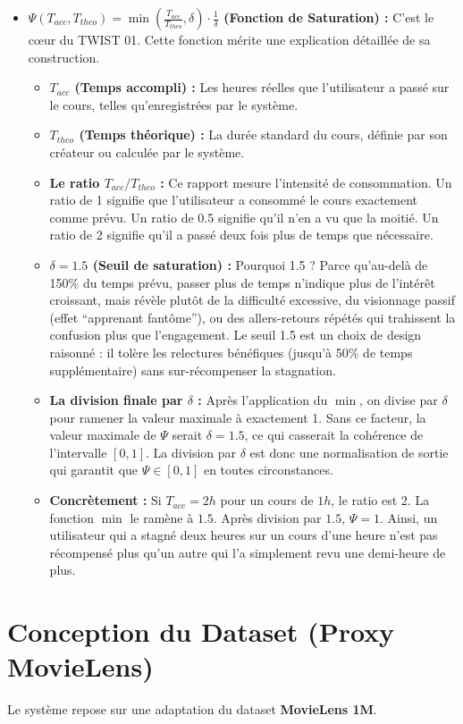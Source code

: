 \documentclass[11pt,a4paper]{article}
\begin{document}
\begin{itemize}
    \item \textbf{$\Psi(T_{acc}, T_{theo}) = \min\left( \frac{T_{acc}}{T_{theo}}, \delta \right) \cdot \frac{1}{\delta}$ (Fonction de Saturation) :}
    C'est le c\oe ur du TWIST 01. Cette fonction mérite une explication détaillée de sa construction.
    \begin{itemize}
        \item \textbf{$T_{acc}$ (Temps accompli) :} Les heures réelles que l'utilisateur a passé sur le cours, telles qu'enregistrées par le système.
        \item \textbf{$T_{theo}$ (Temps théorique) :} La durée standard du cours, définie par son créateur ou calculée par le système.
        \item \textbf{Le ratio $T_{acc}/T_{theo}$ :} Ce rapport mesure l'intensité de consommation. Un ratio de 1 signifie que l'utilisateur a consommé le cours exactement comme prévu. Un ratio de 0.5 signifie qu'il n'en a vu que la moitié. Un ratio de 2 signifie qu'il a passé deux fois plus de temps que nécessaire.
        \item \textbf{$\delta = 1.5$ (Seuil de saturation) :} Pourquoi 1.5 ? Parce qu'au-delà de 150\% du temps prévu, passer plus de temps n'indique plus de l'intérêt croissant, mais révèle plutôt de la difficulté excessive, du visionnage passif (effet ``apprenant fantôme''), ou des allers-retours répétés qui trahissent la confusion plus que l'engagement. Le seuil 1.5 est un choix de design raisonné : il tolère les relectures bénéfiques (jusqu'à 50\% de temps supplémentaire) sans sur-récompenser la stagnation.
        \item \textbf{La division finale par $\delta$ :} Après l'application du $\min$, on divise par $\delta$ pour ramener la valeur maximale à exactement 1. Sans ce facteur, la valeur maximale de $\Psi$ serait $\delta = 1.5$, ce qui casserait la cohérence de l'intervalle $[0,1]$. La division par $\delta$ est donc une normalisation de sortie qui garantit que $\Psi \in [0, 1]$ en toutes circonstances.
        \item \textbf{Concrètement :} Si $T_{acc} = 2h$ pour un cours de $1h$, le ratio est 2. La fonction $\min$ le ramène à $1.5$. Après division par $1.5$, $\Psi = 1$. Ainsi, un utilisateur qui a stagné deux heures sur un cours d'une heure n'est pas récompensé plus qu'un autre qui l'a simplement revu une demi-heure de plus.
    \end{itemize}
\end{itemize}

\section{Conception du Dataset (Proxy MovieLens)}
Le système repose sur une adaptation du dataset \textbf{MovieLens 1M}.
\end{document}
